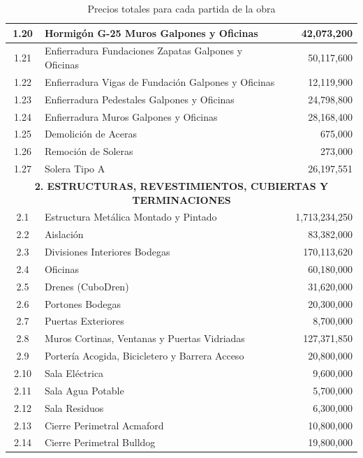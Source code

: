 \documentclass{article} %
\begin{document}
\begin{table}[H]
\begin{tabular}{|c|l|r|}
    1.20 & Hormigón G-25 Muros Galpones y Oficinas & 42,073,200 \\ \hline
    1.21 & Enfierradura Fundaciones Zapatas Galpones y Oficinas & 50,117,600 \\ \hline
    1.22 & Enfierradura Vigas de Fundación Galpones y Oficinas & 12,119,900 \\ \hline
    1.23 & Enfierradura Pedestales Galpones y Oficinas & 24,798,800 \\ \hline
    1.24 & Enfierradura Muros Galpones y Oficinas & 28,168,400 \\ \hline
    1.25 & Demolición de Aceras & 675,000 \\ \hline
    1.26 & Remoción de Soleras & 273,000 \\ \hline
    1.27 & Solera Tipo A & 26,197,551 \\ \hline
    \multicolumn{3}{|c|}{\textbf{2. ESTRUCTURAS, REVESTIMIENTOS, CUBIERTAS Y TERMINACIONES}} \\ \hline
    2.1 & Estructura Metálica Montado y Pintado & 1,713,234,250 \\ \hline
    2.2 & Aislación & 83,382,000 \\ \hline
    2.3 & Divisiones Interiores Bodegas & 170,113,620 \\ \hline
    2.4 & Oficinas & 60,180,000 \\ \hline
    2.5 & Drenes (CuboDren) & 31,620,000 \\ \hline
    2.6 & Portones Bodegas & 20,300,000 \\ \hline
    2.7 & Puertas Exteriores & 8,700,000 \\ \hline
    2.8 & Muros Cortinas, Ventanas y Puertas Vidriadas & 127,371,850 \\ \hline
    2.9 & Portería Acogida, Bicicletero y Barrera Acceso & 20,800,000 \\ \hline
    2.10 & Sala Eléctrica & 9,600,000 \\ \hline
    2.11 & Sala Agua Potable & 5,700,000 \\ \hline
    2.12 & Sala Residuos & 6,300,000 \\ \hline
    2.13 & Cierre Perimetral Acmaford & 10,800,000 \\ \hline
    2.14 & Cierre Perimetral Bulldog & 19,800,000 \\ \hline
    \end{tabular}
    \caption{Precios totales para cada partida de la obra}
    \label{tabla-precios-totales}
\end{table}
    
\end{document}
